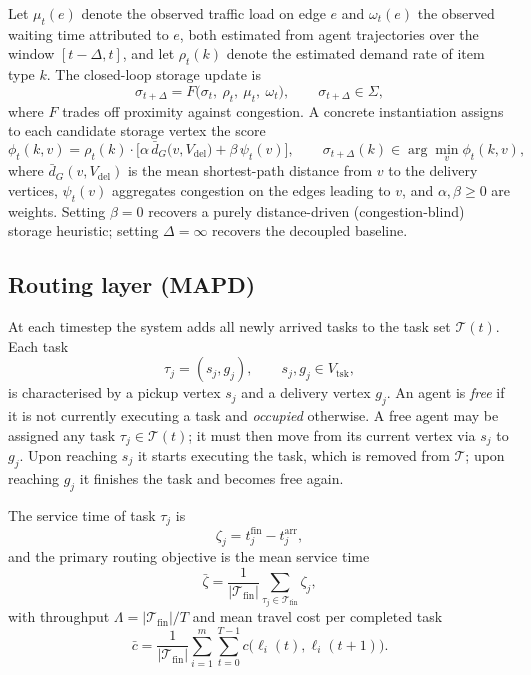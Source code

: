 Let \( \mu_t(e) \) denote the observed traffic load on edge \( e \) and
\( \omega_t(e) \) the observed waiting time attributed to \( e \), both
estimated from agent trajectories over the window \( [t-\Delta, t] \), and let
\( \rho_t(k) \) denote the estimated demand rate of item type \( k \). The
closed-loop storage update is
\begin{equation}
  \sigma_{t+\Delta}
  = F\big( \sigma_t,\ \rho_t,\ \mu_t,\ \omega_t \big),
  \qquad \sigma_{t+\Delta} \in \Sigma ,
  \label{eq:storage-update}
\end{equation}
where \( F \) trades off proximity against congestion. A concrete
instantiation assigns to each candidate storage vertex the score
\begin{equation}
  \phi_t(k, v)
  = \rho_t(k) \cdot \Big[
      \alpha \, \bar{d}_G\big(v, V_{\mathrm{del}}\big)
      + \beta \, \psi_t(v)
    \Big],
  \qquad
  \sigma_{t+\Delta}(k) \in \arg\min_{v} \phi_t(k, v),
  \label{eq:storage-score}
\end{equation}
where \( \bar{d}_G(v, V_{\mathrm{del}}) \) is the mean shortest-path distance
from \( v \) to the delivery vertices, \( \psi_t(v) \) aggregates congestion
on the edges leading to \( v \), and \( \alpha, \beta \geq 0 \) are weights.
Setting \( \beta = 0 \) recovers a purely distance-driven (congestion-blind)
storage heuristic; setting \( \Delta = \infty \) recovers the decoupled
baseline.

\subsection{Routing layer (MAPD)}

At each timestep the system adds all newly arrived tasks to the task set
\( \mathcal{T}(t) \). Each task
\begin{equation}
  \tau_j = (s_j, g_j), \qquad s_j, g_j \in V_{\mathrm{tsk}} ,
\end{equation}
is characterised by a pickup vertex \( s_j \) and a delivery vertex
\( g_j \). An agent is \emph{free} if it is not currently executing a task
and \emph{occupied} otherwise. A free agent may be assigned any task
\( \tau_j \in \mathcal{T}(t) \); it must then move from its current vertex via
\( s_j \) to \( g_j \). Upon reaching \( s_j \) it starts executing the task,
which is removed from \( \mathcal{T} \); upon reaching \( g_j \) it finishes
the task and becomes free again.

The service time of task \( \tau_j \) is
\begin{equation}
  \zeta_j = t^{\mathrm{fin}}_j - t^{\mathrm{arr}}_j ,
\end{equation}
and the primary routing objective is the mean service time
\begin{equation}
  \bar{\zeta} = \frac{1}{|\mathcal{T}_{\mathrm{fin}}|}
    \sum_{\tau_j \in \mathcal{T}_{\mathrm{fin}}} \zeta_j ,
\end{equation}
with throughput \( \Lambda = |\mathcal{T}_{\mathrm{fin}}| / T \) and mean travel
cost per completed task
\begin{equation}
  \bar{c} = \frac{1}{|\mathcal{T}_{\mathrm{fin}}|}
    \sum_{i=1}^{m} \sum_{t=0}^{T-1}
      c\big(\ell_i(t), \ell_i(t+1)\big).
\end{equation}

